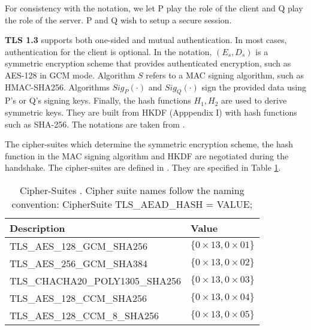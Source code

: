For consistency with the notation, we let P play the role of the client and Q play the role of the server. P and Q wish to setup a secure session. 

\textbf{TLS 1.3} supports both one-sided and mutual authentication. In most cases, authentication for the client is optional. In the notation, $(E_s , D_s)$ is a symmetric encryption scheme that provides authenticated encryption, such as AES-128 in GCM mode.  Algorithm $S$ refers to a MAC signing algorithm, such as HMAC-SHA256. Algorithms $Sig_P(\cdot )$ and $Sig_Q(\cdot )$ sign the provided data using P's or Q's signing keys. Finally, the hash functions $H_1, H_2$ are used to derive symmetric keys. They are built from HKDF (Apppendix I) with hash functions such as SHA-256. The notations are taken from \cite{gradcourse}.

The cipher-suites which determine the symmetric encryption scheme, the hash function in the MAC signing algorithm and HKDF are negotiated during the handshake. The cipher-suites are defined in \cite{rfc8446}. They are specified in Table \ref{tab:ciphersuites}. 






\begin{table}[ht]
  \centering
  \begin{tabular}{|l|l|}
    \hline Description & Value \\
    \hline 
    TLS\_AES\_128\_GCM\_SHA256 & $\{0\times13,0\times01\}$ \\
    \hline TLS\_AES\_256\_GCM\_SHA384 & $\{0\times13,0\times02\}$ \\
    \hline TLS\_CHACHA20\_POLY1305\_SHA256 & $\{0\times13,0\times03\}$ \\
    \hline TLS\_AES\_128\_CCM\_SHA256 & $\{0\times13,0\times04\}$ \\
    \hline TLS\_AES\_128\_CCM\_8\_SHA256 & $\{0\times13,0\times05\}$ \\
    \hline
  \end{tabular}
  \caption{Cipher-Suites \cite{rfc8446}. Cipher suite names follow the naming convention: CipherSuite TLS\_AEAD\_HASH = VALUE;}
  \label{tab:ciphersuites}
\end{table}




